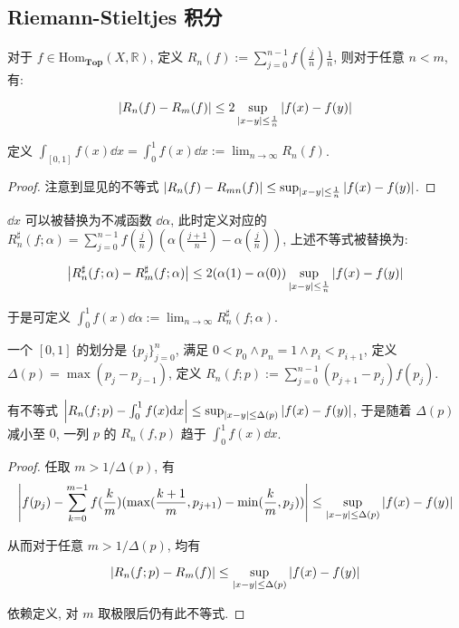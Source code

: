 \subsection{Riemann-Stieltjes 积分}

\begin{definition}
    对于 \(f \in \mathrm{Hom}_{\mathbf{Top}} (X,\mathbb{R})\), 定义 \(R_n (f) := \sum_{j=0}^{n-1} f(\frac{j}{n}) \frac{1}{n}\),
    则对于任意 \(n < m\), 有:

    \[
        \abs {R_n (f) - R_m (f)} \leq 2 \sup_{\abs{x - y} \leq \frac{1}{n}} \abs {f(x) - f(y)}
    \]

    定义 \(\int_{[0,1]} f(x) \dd x = \int_{0}^{1} f(x) \dd x := \lim_{n \to \infty} R_n (f)\).

    \begin{proof}
        注意到显见的不等式 \(\abs {R_n (f) - R_{mn} (f)} \leq \sup_{\abs{x - y} \leq \frac{1}{n}} \abs {f(x) - f(y)}\).
    \end{proof}
\end{definition}

\begin{definition}
    \label {definition:Riemann-Stieltjes integral}
    \(\dd x\) 可以被替换为不减函数 \(\dd \alpha\), 此时定义对应的 \(R_n^\sharp (f;\alpha) = \sum_{j=0}^{n-1} f(\frac{j}{n}) (\alpha(\frac{j+1}{n}) - \alpha(\frac{j}{n}))\),
    上述不等式被替换为:
    
    \[
        \abs {R_n^\sharp (f;\alpha) - R_m^\sharp (f;\alpha)} \leq 2 (\alpha(1) - \alpha(0)) \sup_{\abs{x - y} \leq \frac{1}{n}} \abs {f(x) - f(y)}
    \]

    于是可定义 \(\int_{0}^{1} f(x) \dd \alpha := \lim_{n \to \infty} R_n^\sharp (f;\alpha)\).
\end{definition}

\begin{definition}
    一个 \([0,1]\) 的划分是 \(\{p_j\}_{j=0}^n\), 满足 \(0 < p_0 \land p_n = 1 \land p_i < p_{i+1}\),
    定义 \(\Delta(p) = \max (p_j - p_{j-1})\), 定义 \(R_n (f;p) := \sum_{j=0}^{n-1} (p_{j+1} - p_j) f(p_j)\).
\end{definition}

\begin{lemma}
    有不等式 \(\abs {R_n (f;p) - \int_{0}^{1} f(x) \dd x} \leq \sup_{\abs{x-y} \leq \Delta(p)} \abs{f(x) - f(y)}\),
    于是随着 \(\Delta(p)\) 减小至 \(0\), 一列 \(p\) 的 \(R_n (f,p)\) 趋于 \(\int_{0}^{1} f(x) \dd x\).

    \begin{proof}
        任取 \(m > 1/\Delta(p)\), 有
        \[
            \abs{f(p_j) - \sum_{k=0}^{m-1} f(\frac{k}{m}) (\max (\frac{k+1}{m},p_{j+1}) - \min (\frac{k}{m},p_j))} \leq \sup_{\abs{x-y} \leq \Delta(p)} \abs{f(x) - f(y)}
        \]
        
        从而对于任意 \(m > 1/\Delta(p)\), 均有

        \[
            \abs {R_n (f;p) - R_m(f)} \leq \sup_{\abs{x-y} \leq \Delta(p)} \abs{f(x) - f(y)}
        \]
        
        依赖定义, 对 \(m\) 取极限后仍有此不等式.
    \end{proof}
\end{lemma}

